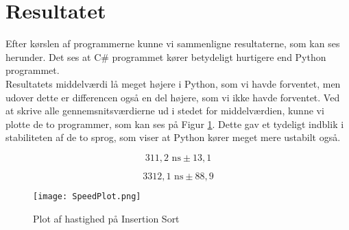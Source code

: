 \documentclass[class=report, crop=false]{standalone}
\begin{document}
    \section{Resultatet}
    Efter kørslen af programmerne kunne vi sammenligne resultaterne, som kan ses herunder. Det ses at C\# programmet kører betydeligt hurtigere end Python programmet.\\
    Resultatets middelværdi lå meget højere i Python, som vi havde forventet, men udover dette er differencen også en del højere, som vi ikke havde forventet. Ved at skrive alle gennemsnitsværdierne ud i stedet for middelværdien, kunne vi plotte de to programmer, som kan ses på Figur \ref{fig:SpeedPlot}. Dette gav et tydeligt indblik i stabiliteten af de to sprog, som viser at Python kører meget mere ustabilt også.

    \begin{tcolorbox}
         \[ 311,2 \text{ ns} \pm 13,1  \]
    \end{tcolorbox}
    \begin{tcolorbox}
         \[ 3312,1 \text{ ns} \pm 88,9  \]
    \end{tcolorbox}

    \begin{tcolorbox}
        \begin{figure}[H]
            \centering
            \texttt{[image: SpeedPlot.png]}
            \caption{Plot af hastighed på Insertion Sort}
            \label{fig:SpeedPlot}
        \end{figure}
    \end{tcolorbox}
\end{document}
